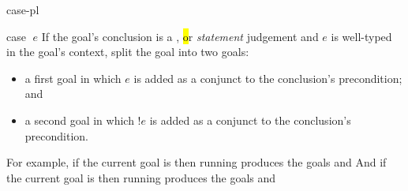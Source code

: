\begin{tactic}[case]{case-pl}
  \begin{tsyntax}{case $\;e$}
    If the goal's conclusion is a \prhl, \hl or \phl \emph{statement}
    judgement and $e$ is well-typed in the goal's context, split the
    goal into two goals:
    \begin{itemize}
    \item a first goal in which $e$ is added as a conjunct to the
      conclusion's precondition; and

    \item a second goal in which $!e$ is added as a conjunct to the
      conclusion's precondition.
    \end{itemize}

    \medskip For example, if the current goal is
     then
    running 
    produces the goals
    and
    And if the current goal is
     then
    running 
    produces the goals
    and
  \end{tsyntax}
\end{tactic}
